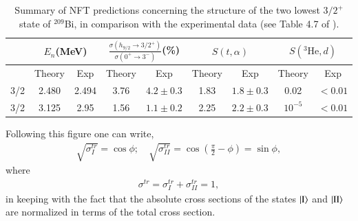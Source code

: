 \begin{table}
\begin{tabular}{|c|c|c|c|c|c|c|c|c|}
\hline
& \multicolumn{2}{|c}{$E_n$(MeV)} & \multicolumn{2}{|c}{$\frac{\sigma(h_{9/2}\rightarrow 3/2^+)}{\sigma(0^+\rightarrow 3^-)}$(\%)} & \multicolumn{2}{|c}{$S(t,\alpha)$}  & \multicolumn{2}{|c|}{$S(^3\text{He},d)$}   \\
\hline
&Theory  & Exp  & Theory  & Exp & Theory & Exp & Theory  & Exp  \\
\hline
3/2& 2.480 & 2.494  & 3.76  & $4.2\pm0.3$  & 1.83  & $1.8\pm0.3$ &0.02  & $<0.01$  \\
3/2& 3.125 & 2.95  & 1.56 & $1.1\pm0.2$  & 2.25  & $2.2\pm0.3$ & $10^{-5}$  & $<0.01$  \\
\hline
\end{tabular}\caption{Summary of NFT predictions concerning the structure of the two lowest $3/2^+$ state of $^{209}$Bi, in comparison with the experimental data (see Table 4.7 of \cite{Bortignon:77}).}\label{tabintroC3}
\end{table}
Following this figure  one can write,
\begin{align}
\sqrt{\sigma_I^{tr}}=\cos\phi;\quad \sqrt{\sigma_{II}^{tr}}=\cos\left(\frac{\pi}{2}-\phi\right)=\sin \phi,
\end{align}
where
\begin{align}
{\sigma^{tr}}={\sigma_I^{tr}}+{\sigma_{II}^{tr}}=1,
\end{align}
in keeping with the fact that the absolute cross sections of the states $|{\text{I}} \rangle$ and $|{\text{II}} \rangle$ are normalized in terms of the total cross section.


